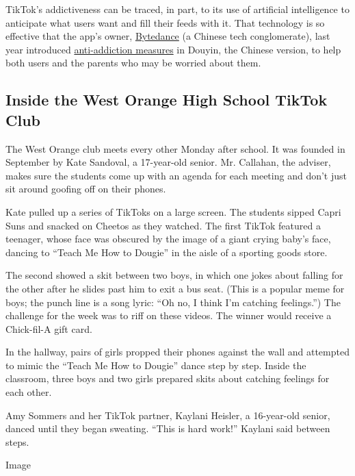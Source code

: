 TikTok's addictiveness can be traced, in part, to its use of artificial
intelligence to anticipate what users want and fill their feeds with it.
That technology is so effective that the app's owner,
\href{https://www.nytimes.com/2018/10/29/technology/bytedance-app-funding-china.html}{Bytedance}
(a Chinese tech conglomerate), last year introduced
\href{https://www.scmp.com/tech/apps-social/article/3003796/china-launches-anti-addiction-drive-protect-countrys-short-video}{anti-addiction
measures} in Douyin, the Chinese version, to help both users and the
parents who may be worried about them.

\hypertarget{inside-the-west-orange-high-school-tiktok-club}{%
\subsection{Inside the West Orange High School TikTok
Club}\label{inside-the-west-orange-high-school-tiktok-club}}

The West Orange club meets every other Monday after school. It was
founded in September by Kate Sandoval, a 17-year-old senior. Mr.
Callahan, the adviser, makes sure the students come up with an agenda
for each meeting and don't just sit around goofing off on their phones.

Kate pulled up a series of TikToks on a large screen. The students
sipped Capri Suns and snacked on Cheetos as they watched. The first
TikTok featured a teenager, whose face was obscured by the image of a
giant crying baby's face, dancing to ``Teach Me How to Dougie'' in the
aisle of a sporting goods store.

The second showed a skit between two boys, in which one jokes about
falling for the other after he slides past him to exit a bus seat. (This
is a popular meme for boys; the punch line is a song lyric: ``Oh no, I
think I'm catching feelings.'') The challenge for the week was to riff
on these videos. The winner would receive a Chick-fil-A gift card.

In the hallway, pairs of girls propped their phones against the wall and
attempted to mimic the ``Teach Me How to Dougie'' dance step by step.
Inside the classroom, three boys and two girls prepared skits about
catching feelings for each other.

Amy Sommers and her TikTok partner, Kaylani Heisler, a 16-year-old
senior, danced until they began sweating. ``This is hard work!'' Kaylani
said between steps.

Image


